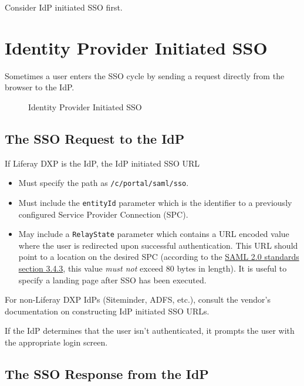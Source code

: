 Consider IdP initiated SSO first.

\section{Identity Provider Initiated
SSO}\label{identity-provider-initiated-sso}

Sometimes a user enters the SSO cycle by sending a request directly from
the browser to the IdP.

\begin{figure}
\centering
{}
\caption{Identity Provider Initiated SSO}
\end{figure}

\subsection{The SSO Request to the
IdP}\label{the-sso-request-to-the-idp}

If Liferay DXP is the IdP, the IdP initiated SSO URL

\begin{itemize}
\tightlist
\item
  Must specify the path as \texttt{/c/portal/saml/sso}.
\item
  Must include the \texttt{entityId} parameter which is the identifier
  to a previously configured Service Provider Connection (SPC).
\item
  May include a \texttt{RelayState} parameter which contains a URL
  encoded value where the user is redirected upon successful
  authentication. This URL should point to a location on the desired SPC
  (according to the
  \href{https://docs.oasis-open.org/security/saml/v2.0/saml-bindings-2.0-os.pdf}{SAML
  2.0 standards section 3.4.3}, this value \emph{must not} exceed 80
  bytes in length). It is useful to specify a landing page after SSO has
  been executed.
\end{itemize}

For non-Liferay DXP IdPs (Siteminder, ADFS, etc.), consult the vendor's
documentation on constructing IdP initiated SSO URLs.

If the IdP determines that the user isn't authenticated, it prompts the
user with the appropriate login screen.

\subsection{The SSO Response from the
IdP}\label{the-sso-response-from-the-idp}

